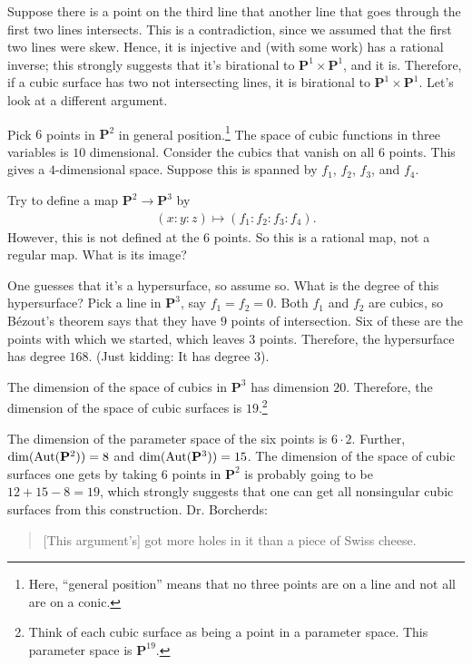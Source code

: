 \documentclass [11 pt, oneside] {article}
\begin{document}
Suppose there is a point on the third line that another line that goes through the first two lines intersects. This is a contradiction, since we assumed that the first two lines were skew. Hence, it is injective and (with some work) has a rational inverse; this strongly suggests that it's birational to $ \mathbf{P}^1\times \mathbf{P}^1$, and it is. Therefore, if a cubic surface has two not intersecting lines, it is birational to $\mathbf{P}^1\times \mathbf{P}^1$. Let's look at a different argument.

Pick $6$ points in $\mathbf{P}^2$ in general position.\footnote{Here, ``general position'' means that no three points are on a line and not all are on a conic.} The space of cubic functions in three variables is $10$ dimensional. Consider the cubics that vanish on all $6$ points. This gives a $4$-dimensional space. Suppose this is spanned by $f_1$, $f_2$, $f_3$, and $f_4$.

Try to define a map $\mathbf{P}^2 \longrightarrow \mathbf{P}^3$ by 
\begin{align*}
	(x:y:z)\longmapsto  (f_1:f_2:f_3:f_4).
\end{align*}
However, this is not defined at the $6$ points. So this is a rational map, not a regular map. What is its image?

One guesses that it's a hypersurface, so assume so. What is the degree of this hypersurface? Pick a line in $\mathbf{P}^3$, say $f_1=f_2=0$. Both $f_1$ and $f_2$ are cubics, so B\'ezout's theorem says that they have $9$ points of intersection. Six of these are the points with which we started, which leaves $3$ points. Therefore, the hypersurface has degree $168$. (Just kidding: It has degree $3$).

The dimension of the space of cubics in $\mathbf{P}^3$ has dimension $20$. Therefore, the dimension of the space of cubic surfaces is $19$.\footnote{Think of each cubic surface as being a point in a parameter space. This parameter space is $\mathbf{P}^{19}$.}

The dimension of the parameter space of the six points is $6\cdot 2$. Further, $\dim (\operatorname{Aut}(\mathbf{P}^2))=8$ and $\dim(\operatorname{Aut}(\mathbf{P}^3)) =15$. The dimension of the space of cubic surfaces one gets by taking $6$ points in $\mathbf{P}^2$ is probably going to be $12+15-8=19$, which strongly suggests that one can get all nonsingular cubic surfaces from this construction. Dr. Borcherds:
\begin{quote}
	\small 
	[This argument's] got more holes in it than a piece of Swiss cheese.
\end{quote}
\end{document}
